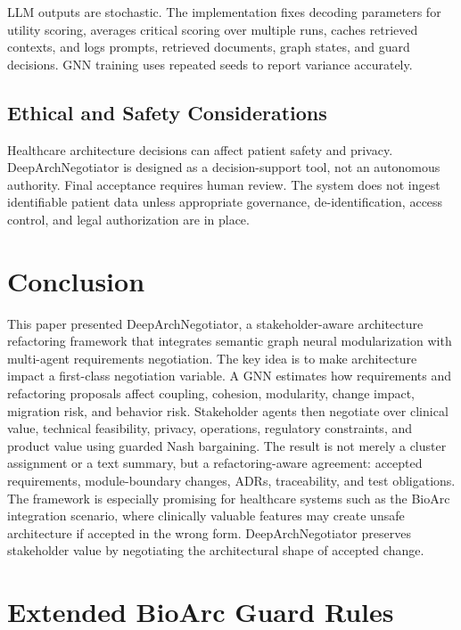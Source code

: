 \documentclass[english,preprint,nonatbib]{elsarticle}
\begin{document}
LLM outputs are stochastic. The implementation fixes decoding parameters for utility scoring, averages critical scoring over multiple runs, caches retrieved contexts, and logs prompts, retrieved documents, graph states, and guard decisions.
GNN training uses repeated seeds to report variance accurately.

\subsection{Ethical and Safety Considerations}

Healthcare architecture decisions can affect patient safety and privacy.
DeepArchNegotiator is designed as a decision-support tool, not an autonomous authority. Final acceptance requires human review.
The system does not ingest identifiable patient data unless appropriate governance, de-identification, access control, and legal authorization are in place.

\section{Conclusion}
\label{sec:conclusion}

This paper presented DeepArchNegotiator, a stakeholder-aware architecture refactoring framework that integrates semantic graph neural modularization with multi-agent requirements negotiation.
The key idea is to make architecture impact a first-class negotiation variable.
A GNN estimates how requirements and refactoring proposals affect coupling, cohesion, modularity, change impact, migration risk, and behavior risk.
Stakeholder agents then negotiate over clinical value, technical feasibility, privacy, operations, regulatory constraints, and product value using guarded Nash bargaining.
The result is not merely a cluster assignment or a text summary, but a refactoring-aware agreement: accepted requirements, module-boundary changes, ADRs, traceability, and test obligations.
The framework is especially promising for healthcare systems such as the BioArc integration scenario, where clinically valuable features may create unsafe architecture if accepted in the wrong form.
DeepArchNegotiator preserves stakeholder value by negotiating the architectural shape of accepted change.

\appendix


\section{Extended BioArc Guard Rules}
\label{app:bioarc-guard}
\end{document}
